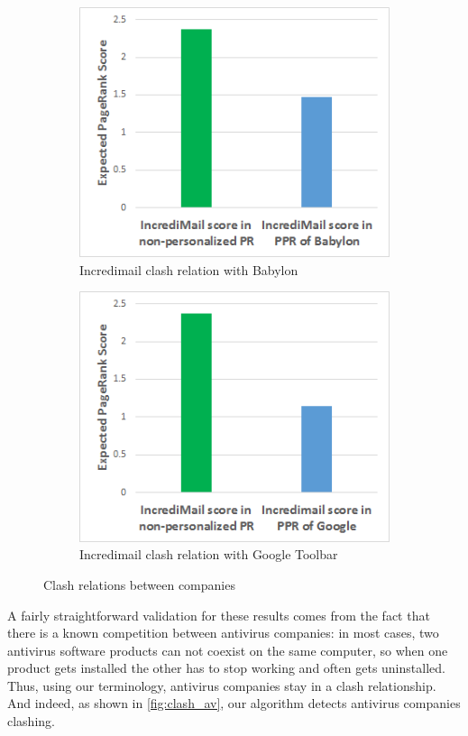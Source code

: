 \documentclass[11pt,oneside]{book}
\begin{document}
\begin{figure}[!htbp]
\centering
\begin{subfigure}[b]{0.8\textwidth}
	\centering
\includegraphics[scale=0.8]{figures/incredi_clash_babylon.png}
\caption{Incredimail clash relation with Babylon}
\label{fig:incredi_clash_babylon}
\end{subfigure}
\begin{subfigure}[b]{0.8\textwidth}
	\centering
\includegraphics[scale=0.8]{figures/incredi_clash_google.png}
\caption{Incredimail clash relation with Google Toolbar}
\label{fig:incredi_clash_google}
\end{subfigure}
\caption{Clash relations between companies}
	\label{fig:clash_2}
\end{figure}

A fairly straightforward validation for these results comes from the fact that there is a known competition between antivirus companies: in most cases, two antivirus software products can not coexist on the same computer, so when one product gets installed the other has to stop working and often gets uninstalled. Thus, using our terminology, antivirus companies stay in a clash relationship. And indeed, as shown in \autoref{fig:clash_av}, our algorithm detects antivirus companies clashing.
\end{document}
